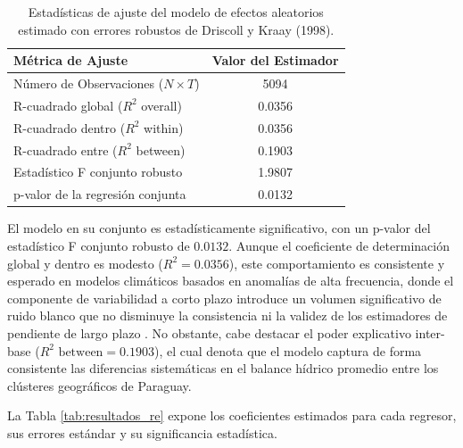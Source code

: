 \begin{table}[ht!]
\centering
\caption{Estadísticas de ajuste del modelo de efectos aleatorios estimado con errores robustos de Driscoll y Kraay (1998).}
\label{tab:estadisticas_modelo}
\vspace{-0.6cm}
\singlespacing %
\small         %
\begin{tabular}{p{8cm}c}
\hline\hline
\textbf{Métrica de Ajuste} & \textbf{Valor del Estimador} \\ \hline
Número de Observaciones ($N \times T$) & 5094 \\
R-cuadrado global ($R^2$ overall) & 0.0356 \\
R-cuadrado dentro ($R^2$ within) & 0.0356 \\
R-cuadrado entre ($R^2$ between) & 0.1903 \\
Estadístico F conjunto robusto & 1.9807 \\
p-valor de la regresión conjunta & 0.0132 \\
\hline\hline
\end{tabular}
\end{table}

El modelo en su conjunto es estadísticamente significativo, con un p-valor del estadístico F conjunto robusto de $0.0132$. Aunque el coeficiente de determinación global y dentro es modesto ($R^2 = 0.0356$), este comportamiento es consistente y esperado en modelos climáticos basados en anomalías de alta frecuencia, donde el componente de variabilidad a corto plazo introduce un volumen significativo de ruido blanco que no disminuye la consistencia ni la validez de los estimadores de pendiente de largo plazo \cite{stocker_climate_2013}. No obstante, cabe destacar el poder explicativo inter-base ($R^2 \text{ between} = 0.1903$), el cual denota que el modelo captura de forma consistente las diferencias sistemáticas en el balance hídrico promedio entre los clústeres geográficos de Paraguay.

La Tabla \ref{tab:resultados_re} expone los coeficientes estimados para cada regresor, sus errores estándar y su significancia estadística.

